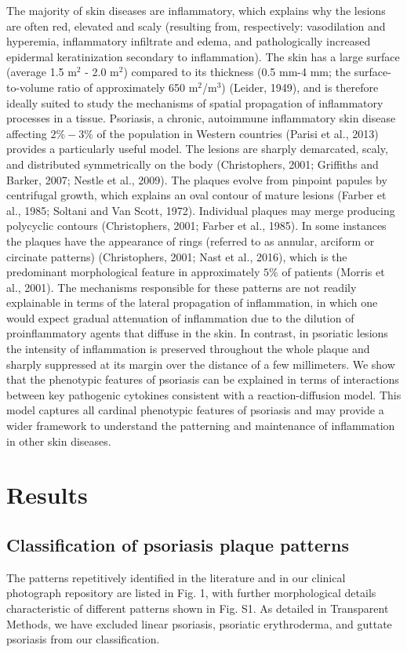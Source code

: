 The majority of skin diseases are inflammatory, which explains why the lesions are often red, elevated and scaly (resulting from, respectively:  vasodilation and hyperemia, inflammatory infiltrate and edema, and pathologically increased epidermal keratinization secondary to inflammation). The skin has a large surface (average 1.5 m$^2$ - 2.0 m$^2$) compared to its thickness (0.5 mm-4 mm; the surface-to-volume ratio of approximately 650 m$^2$/m$^3$) (Leider, 1949), and is therefore ideally suited to study the mechanisms of spatial propagation of inflammatory processes in a tissue. Psoriasis, a chronic, autoimmune inflammatory skin disease affecting $2\%-3\%$ of the population in Western countries (Parisi et al., 2013) provides a particularly useful model. The lesions are sharply demarcated, scaly, and distributed symmetrically on the body (Christophers, 2001; Griffiths and Barker, 2007; Nestle et al., 2009). The plaques evolve from pinpoint papules by centrifugal growth, which explains an oval contour of mature lesions (Farber et al., 1985; Soltani and Van Scott, 1972). Individual plaques may merge producing polycyclic contours (Christophers, 2001; Farber et al., 1985). In some instances the plaques have the appearance of rings (referred to as annular, arciform or circinate patterns) (Christophers, 2001; Nast et al., 2016), which is the predominant morphological feature in approximately $5\%$ of patients (Morris et al., 2001). The mechanisms responsible for these patterns are not readily explainable in terms of the lateral propagation of inflammation, in which one would expect gradual attenuation of inflammation due to the dilution of proinflammatory agents that diffuse in the skin. In contrast, in psoriatic lesions the intensity of inflammation is preserved throughout the whole plaque and sharply suppressed at its margin over the distance of a few millimeters. We show that the phenotypic features of psoriasis can be explained in terms of interactions between key pathogenic cytokines consistent with a reaction-diffusion model. This model captures all cardinal phenotypic features of psoriasis and may provide a wider framework to understand the patterning and maintenance of inflammation in other skin diseases. 

\section{Results}
\subsection{Classification of psoriasis plaque patterns}
The patterns repetitively identified in the literature and in our clinical photograph repository are listed in Fig. 1, with further morphological details characteristic of different patterns shown in Fig. S1. As detailed in Transparent Methods, we have excluded linear psoriasis, psoriatic erythroderma, and guttate psoriasis from our classification. 

